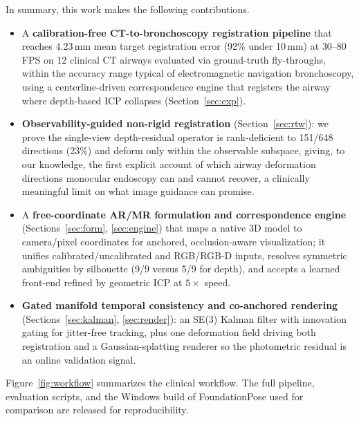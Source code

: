 \documentclass[9pt,twoside,web]{ieeecolor2}
\begin{document}
In summary, this work makes the following contributions.
\begin{itemize}
\item A \textbf{calibration-free CT-to-bronchoscopy registration pipeline} that reaches 4.23\,mm mean target registration error (92\% under 10\,mm) at 30--80\,FPS on 12 clinical CT airways evaluated via ground-truth fly-throughs, within the accuracy range typical of electromagnetic navigation bronchoscopy, using a centerline-driven correspondence engine that registers the airway where depth-based ICP collapses (Section~\ref{sec:exp}).
\item \textbf{Observability-guided non-rigid registration} (Section~\ref{sec:rtw}): we prove the single-view depth-residual operator is rank-deficient to 151/648 directions (23\%) and deform only within the observable subspace, giving, to our knowledge, the first explicit account of which airway deformation directions monocular endoscopy can and cannot recover, a clinically meaningful limit on what image guidance can promise.
\item A \textbf{free-coordinate AR/MR formulation and correspondence engine} (Sections~\ref{sec:form}, \ref{sec:engine}) that maps a native 3D model to camera/pixel coordinates for anchored, occlusion-aware visualization; it unifies calibrated/uncalibrated and RGB/RGB-D inputs, resolves symmetric ambiguities by silhouette (9/9 versus 5/9 for depth), and accepts a learned front-end refined by geometric ICP at $5\times$ speed.
\item \textbf{Gated manifold temporal consistency and co-anchored rendering} (Sections~\ref{sec:kalman}, \ref{sec:render}): an SE(3) Kalman filter with innovation gating for jitter-free tracking, plus one deformation field driving both registration and a Gaussian-splatting renderer so the photometric residual is an online validation signal.
\end{itemize}

Figure~\ref{fig:workflow} summarizes the clinical workflow. The full pipeline, evaluation scripts, and the Windows build of FoundationPose used for comparison are released for reproducibility.
\end{document}
